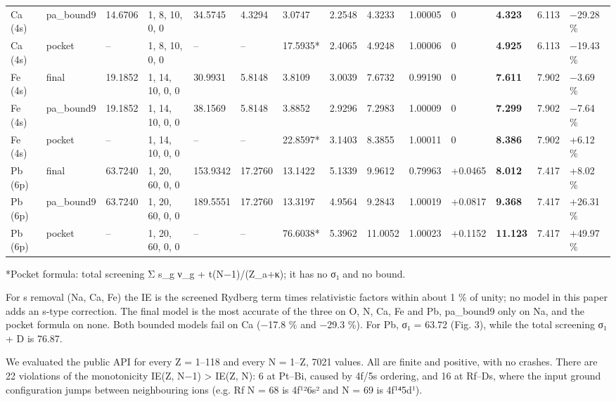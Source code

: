 \documentclass[aps,pra,preprint,superscriptaddress,amsmath,amssymb]{revtex4-2}
\begin{document}
\begin{table}[htbp]
{\begin{tabular}{llllllllllllll}
Ca (4s) & pa\_bound9 & 14.6706 & 1, 8, 10, 0, 0 & 34.5745 & 4.3294 & 3.0747 & 2.2548 & 4.3233 & 1.00005 & 0 & \textbf{4.323} & 6.113 & −29.28 \% \\
Ca (4s) & pocket & – & 1, 8, 10, 0, 0 & – & – & 17.5935* & 2.4065 & 4.9248 & 1.00006 & 0 & \textbf{4.925} & 6.113 & −19.43 \% \\
Fe (4s) & final & 19.1852 & 1, 14, 10, 0, 0 & 30.9931 & 5.8148 & 3.8109 & 3.0039 & 7.6732 & 0.99190 & 0 & \textbf{7.611} & 7.902 & −3.69 \% \\
Fe (4s) & pa\_bound9 & 19.1852 & 1, 14, 10, 0, 0 & 38.1569 & 5.8148 & 3.8852 & 2.9296 & 7.2983 & 1.00009 & 0 & \textbf{7.299} & 7.902 & −7.64 \% \\
Fe (4s) & pocket & – & 1, 14, 10, 0, 0 & – & – & 22.8597* & 3.1403 & 8.3855 & 1.00011 & 0 & \textbf{8.386} & 7.902 & +6.12 \% \\
Pb (6p) & final & 63.7240 & 1, 20, 60, 0, 0 & 153.9342 & 17.2760 & 13.1422 & 5.1339 & 9.9612 & 0.79963 & +0.0465 & \textbf{8.012} & 7.417 & +8.02 \% \\
Pb (6p) & pa\_bound9 & 63.7240 & 1, 20, 60, 0, 0 & 189.5551 & 17.2760 & 13.3197 & 4.9564 & 9.2843 & 1.00019 & +0.0817 & \textbf{9.368} & 7.417 & +26.31 \% \\
Pb (6p) & pocket & – & 1, 20, 60, 0, 0 & – & – & 76.6038* & 5.3962 & 11.0052 & 1.00023 & +0.1152 & \textbf{11.123} & 7.417 & +49.97 \% \\
\hline\hline
\end{tabular}}
\end{table}


*Pocket formula: total screening Σ s\_g ν\_g + t(N−1)/(Z\_a+κ); it has no σ₁ and no bound.


For s removal (Na, Ca, Fe) the IE is the screened Rydberg term times relativistic factors within about 1 \% of unity; no model in this paper adds an s-type correction. The final model is the most accurate of the three on O, N, Ca, Fe and Pb, pa\_bound9 only on Na, and the pocket formula on none. Both bounded models fail on Ca (−17.8 \% and −29.3 \%). For Pb, σ₁ = 63.72 (Fig. 3), while the total screening σ₁ + D is 76.87.


We evaluated the public API for every Z = 1–118 and every N = 1–Z, 7021 values. All are finite and positive, with no crashes. There are 22 violations of the monotonicity IE(Z, N−1) > IE(Z, N): 6 at Pt–Bi, caused by 4f/5s ordering, and 16 at Rf–Ds, where the input ground configuration jumps between neighbouring ions (e.g. Rf N = 68 is 4f¹²6s² and N = 69 is 4f¹⁴5d¹).
\end{document}
